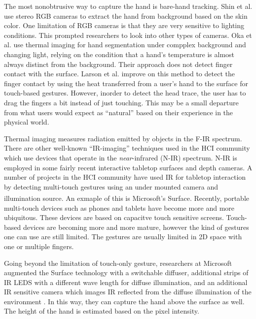 The most nonobtrusive way to capture the hand is bare-hand tracking. Shin et al. \cite{Shin04} use
stereo RGB cameras to extract the hand from background based on the skin color. One
limitation of RGB cameras is that they are very sensitive to lighting
conditions. This prompted researchers to look into other types of cameras. Oka et al. 
\cite{Oka02} use thermal imaging for hand segmentation under compplex
background and changing light, relying on the condition that a hand's
temperature is almost always distinct from the background. Their approach does
not detect finger contact with the surface. Larson et al. \cite{larson11}
improve on this method to detect the finger contact by using
the heat transferred from a user's hand to the surface for touch-based gestures.
However, inorder to detect the head trace, the user has to drag the fingers a
bit instead of just touching. This may be a small departure from what users
would expect as ``natural'' based on their experience in the physical world.

Thermal imaging measures radiation emitted by objects in the F-IR spectrum.
There are other well-known ``IR-imaging'' techniques used in the HCI community
which use devices that operate in the \textit{near}-infrared (N-IR) spectrum.
N-IR is employed in some fairly recent interactive tabletop surfaces and depth
cameras. A number of projects in the HCI community have used IR for tabletop
interaction by detecting multi-touch gestures using an under mounted
camera and illumination source. An exmaple of this is Microsoft's 
Surface\textsuperscript{\textregistered}. Recently, portable multi-touch devices
such as phones and tablets have become more and more ubiquitous. These devices
are based on capacitve touch sensitive screens. Touch-based devices are becoming
more and more mature, however the kind of gestures one can use are still
limited. The gestures are usually limited in 2D space with one or multiple
fingers. 

Going beyond the limitation of touch-only gesture, researchers at Microsoft
augmented the Surface technology with a switchable diffuser, additional
strips of IR LEDS with a different wave length for diffuse illumination, and an
additional IR sensitive camera which images IR reflected from the diffuse
illumination of the environment \cite{hilliges09}. In this way, they can capture
the hand above the surface as well. The height of the hand is estimated based on
the pixel intensity.

